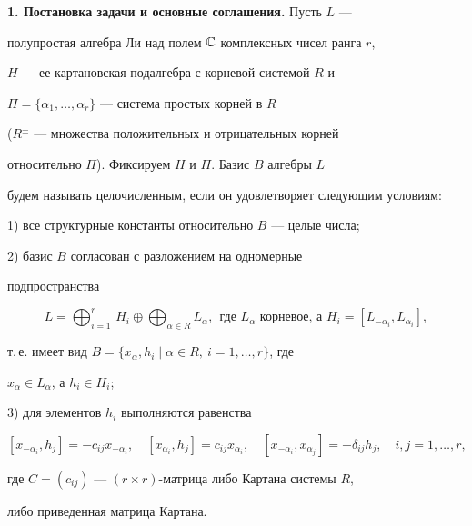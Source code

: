\label{begin}








{\bf 1. Постановка задачи и основные соглашения.} Пусть $L$ ---


полупростая алгебра Ли над полем $\Bbb C$ комплексных чисел ранга $r$,


$H$ --- ее картановская подалгебра с корневой системой $R$ и


$\Pi=\{\alpha_1,\dotsc,\alpha_r\}$ --- система простых корней в $R$


($R^\pm$ --- множества положительных и отрицательных корней


относительно $\Pi$). Фиксируем $H$ и $\Pi$. Базис $B$ алгебры $L$


будем называть целочисленным, если он удовлетворяет следующим условиям:





1) все структурные константы относительно $B$ ---  целые числа;





2) базис $B$ согласован с разложением на одномерные


подпространства


$$


L=\bigoplus_{i=1}^r\,H_i\oplus\bigoplus_{\alpha\in R}L_\alpha,


\ \ \text{где $L_\alpha$ корневое, а 


$H_i=[L_{-\alpha_i},L_{\alpha_i}]$},


$$


т.\,е. имеет вид $B=\{x_\alpha,h_i\mid \alpha\in R,\ i=1,\dotsc,r\}$, где


$x_\alpha\in L_\alpha$, а $h_i\in H_i$;





3) для элементов $h_i$ выполняются равенства


$$


[x_{-\alpha_i},h_j]=-c_{ij}x_{-\alpha_i},\quad


[x_{\alpha_i},h_j]=c_{ij}x_{\alpha_i}, \quad


[x_{-\alpha_i},x_{\alpha_j}]=-\delta _{ij}h_j,\quad i,j=1,\dotsc,r,


$$


где $C=(c_{ij})$ --- $(r\times r)$-матрица либо Картана системы $R$,


либо приведенная матрица Картана.





